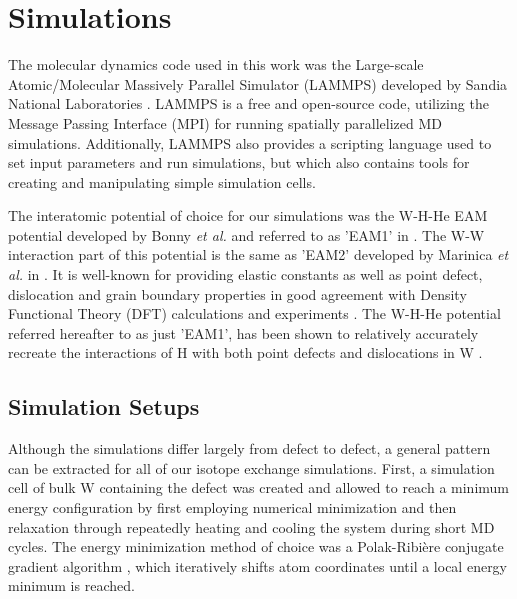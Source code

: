 \chapter{Simulations}

The molecular dynamics code used in this work was the Large-scale Atomic/Molecular Massively Parallel Simulator (LAMMPS) developed by Sandia National Laboratories \cite{lammpsMD}. 
LAMMPS is a free and open-source code, utilizing the Message Passing Interface (MPI) for running spatially parallelized MD simulations.
Additionally, LAMMPS also provides a scripting language used to set input parameters and run simulations, but which also contains tools for creating and manipulating simple simulation cells.    

The interatomic potential of choice for our simulations was the W-H-He EAM potential developed by Bonny \textit{et al.} and referred to as 'EAM1' in \cite{bonny2014binding}. 
The W-W interaction part of this potential is the same as 'EAM2' developed by Marinica \textit{et al.} in \cite{marinica2013interatomic}. 
It is well-known for providing elastic constants as well as point defect, dislocation and grain boundary properties in good agreement with Density Functional Theory (DFT) calculations and experiments \cite{bonny2014many}. 
The W-H-He potential referred hereafter to as just 'EAM1', has been shown to relatively accurately recreate the interactions of H with both point defects and dislocations in W \cite{bonny2014binding, grigorev2015interaction}. 


\section{Simulation Setups}
Although the simulations differ largely from defect to defect, a general pattern can be extracted for all of our isotope exchange simulations. 
First, a simulation cell of bulk W containing the defect was created and allowed to reach a minimum energy configuration by first employing numerical minimization and then relaxation through repeatedly heating and cooling the system during short MD cycles. 
The energy minimization method of choice was a Polak-Ribi\`{e}re conjugate gradient algorithm \cite{polak1969note}, which iteratively shifts atom coordinates until a local energy minimum is reached. 

